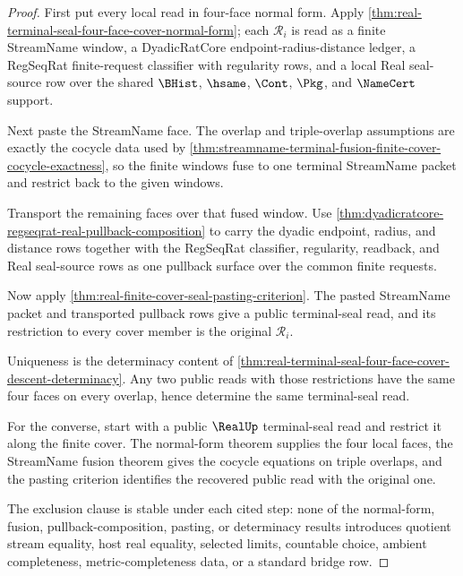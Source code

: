 \begin{proof}
First put every local read in four-face normal form. Apply
\autoref{thm:real-terminal-seal-four-face-cover-normal-form}; each
$\mathcal R_i$ is read as a finite StreamName window, a DyadicRatCore
endpoint-radius-distance ledger, a RegSeqRat finite-request classifier with
regularity rows, and a local Real seal-source row over the shared $\BHist$,
$\hsame$, $\Cont$, $\Pkg$, and $\NameCert$ support.

Next paste the StreamName face. The overlap and triple-overlap assumptions are
exactly the cocycle data used by
\autoref{thm:streamname-terminal-fusion-finite-cover-cocycle-exactness}, so
the finite windows fuse to one terminal StreamName packet and restrict back to
the given windows.

Transport the remaining faces over that fused window. Use
\autoref{thm:dyadicratcore-regseqrat-real-pullback-composition} to carry the
dyadic endpoint, radius, and distance rows together with the RegSeqRat
classifier, regularity, readback, and Real seal-source rows as one pullback
surface over the common finite requests.

Now apply \autoref{thm:real-finite-cover-seal-pasting-criterion}. The pasted
StreamName packet and transported pullback rows give a public terminal-seal
read, and its restriction to every cover member is the original
$\mathcal R_i$.

Uniqueness is the determinacy content of
\autoref{thm:real-terminal-seal-four-face-cover-descent-determinacy}. Any two
public reads with those restrictions have the same four faces on every overlap,
hence determine the same terminal-seal read.

For the converse, start with a public $\RealUp$ terminal-seal read and restrict
it along the finite cover. The normal-form theorem supplies the four local
faces, the StreamName fusion theorem gives the cocycle equations on triple
overlaps, and the pasting criterion identifies the recovered public read with
the original one.

The exclusion clause is stable under each cited step: none of the normal-form,
fusion, pullback-composition, pasting, or determinacy results introduces
quotient stream equality, host real equality, selected limits, countable
choice, ambient completeness, metric-completeness data, or a standard bridge
row.
\end{proof}


